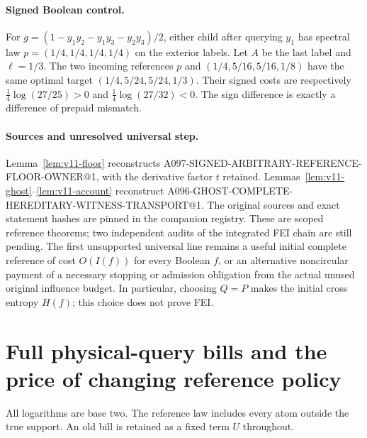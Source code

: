 \documentclass[11pt]{article}
\begin{document}
\paragraph{Signed Boolean control.}
For $g=(1-y_1y_2-y_1y_3-y_2y_3)/2$, either child after querying $y_1$ has
spectral law $p=(1/4,1/4,1/4,1/4)$ on the exterior labels.
Let $A$ be the last label and $\ell=1/3$. The two incoming references
$p$ and $(1/4,5/16,5/16,1/8)$ have the same optimal target
$(1/4,5/24,5/24,1/3)$. Their signed costs are respectively
$\frac14\log(27/25)>0$ and $\frac14\log(27/32)<0$.
The sign difference is exactly a difference of prepaid mismatch.

\paragraph{Sources and unresolved universal step.}
Lemma~\ref{lem:v11-floor} reconstructs A097-SIGNED-ARBITRARY-REFERENCE-FLOOR-OWNER@1,
with the derivative factor $t$ retained. Lemmas~\ref{lem:v11-ghost}--\ref{lem:v11-account}
reconstruct A096-GHOST-COMPLETE-HEREDITARY-WITNESS-TRANSPORT@1.
The original sources and exact statement hashes are pinned in the companion registry.
These are scoped reference theorems; two independent audits of the integrated FEI
chain are still pending. The first unsupported universal line remains a useful
initial complete reference of cost $O(I(f))$ for every Boolean $f$, or an alternative
noncircular payment of a necessary stopping or admission obligation from the actual
unused original influence budget. In particular, choosing $Q=P$ makes the initial
cross entropy $H(f)$; this choice does not prove FEI.

\section{Full physical-query bills and the price of changing reference policy}
\label{sec:v12}
All logarithms are base two. The reference law includes every atom outside the true
support. An old bill is retained as a fixed term $U$ throughout.
\end{document}
